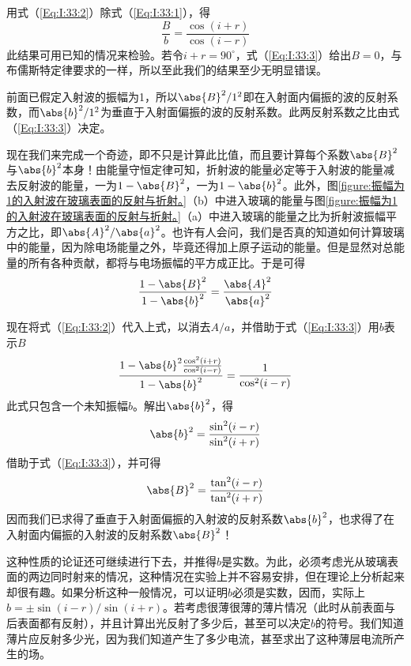 用式（\ref{Eq:I:33:2}）除式（\ref{Eq:I:33:1}），得
\begin{equation}
    \label{Eq:I:33:3}
    \frac{B}{b} = \frac{\cos(i+r)}{\cos(i-r)}
\end{equation}
此结果可用已知的情况来检验。若令$i+r=90^\circ$，式（\ref{Eq:I:33:3}）给出$B=0$，与布儒斯特定律要求的一样，所以至此我们的结果至少无明显错误。

前面已假定入射波的振幅为1，所以$\abs{B}^2/1^2$即在入射面内偏振的波的反射系数，而$\abs{b}^2/1^2$为垂直于入射面偏振的波的反射系数。此两反射系数之比由式（\ref{Eq:I:33:3}）决定。

现在我们来完成一个奇迹，即不只是计算此比值，而且要计算每个系数$\abs{B}^2$与$\abs{b}^2$本身！由能量守恒定律可知，折射波的能量必定等于入射波的能量减去反射波的能量，一为$1-\abs{B}^2$，一为$1-\abs{b}^2$。此外，图\ref{figure:振幅为1的入射波在玻璃表面的反射与折射。}（b）中进入玻璃的能量与图\ref{figure:振幅为1的入射波在玻璃表面的反射与折射。}（a）中进入玻璃的能量之比为折射波振幅平方之比，即$\abs{A}^2/\abs{a}^2$。也许有人会问，我们是否真的知道如何计算玻璃中的能量，因为除电场能量之外，毕竟还得加上原子运动的能量。但是显然对总能量的所有各种贡献，都将与电场振幅的平方成正比。于是可得
\begin{equation}
    \label{Eq:I:33:4}
    \frac{1-\abs{B}^2}{1-\abs{b}^2} = \frac{\abs{A}^2}{\abs{a}^2}
\end{equation}

现在将式（\ref{Eq:I:33:2}）代入上式，以消去$A/a$，并借助于式（\ref{Eq:I:33:3}）用$b$表示$B$
\begin{equation}
    \label{Eq:I:33:5}
    \frac{1-\abs{b}^2\frac{\cos^2(i+r)}{\cos^2(i-r)}}{1-\abs{b}^2} = \frac{1}{\cos^2(i-r)}
\end{equation}
此式只包含一个未知振幅$b$。解出$\abs{b}^2$，得
\begin{equation}
    \label{Eq:I:33:6}
    \abs{b}^2 = \frac{\sin^2(i-r)}{\sin^2(i+r)}
\end{equation}
借助于式（\ref{Eq:I:33:3}），并可得
\begin{equation}
    \label{Eq:I:33:7}
    \abs{B}^2 = \frac{\tan^2(i-r)}{\tan^2(i+r)}
\end{equation}
因而我们已求得了垂直于入射面偏振的入射波的反射系数$\abs{b}^2$，也求得了在入射面内偏振的入射波的反射系数$\abs{B}^2$！

这种性质的论证还可继续进行下去，并推得$b$是实数。为此，必须考虑光从玻璃表面的两边同时射来的情况，这种情况在实验上并不容易安排，但在理论上分析起来却很有趣。如果分析这种一般情况，可以证明$b$必须是实数，因而，实际上$b=\pm \sin(i-r)/\sin(i+r)$。若考虑很薄很薄的薄片情况（此时从前表面与后表面都有反射），并且计算出光反射了多少后，甚至可以决定$b$的符号。我们知道薄片应反射多少光，因为我们知道产生了多少电流，甚至求出了这种薄层电流所产生的场。

